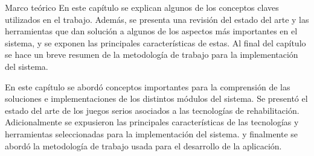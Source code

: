 \begin{thesischapter}{1} {Marco teórico}
En este capítulo se explican algunos de los conceptos claves utilizados en el trabajo. Además, se presenta una revisión del estado del arte y las herramientas que dan solución a algunos de los aspectos más importantes en el sistema, y se exponen las principales características de estas. Al final del capítulo se hace un breve resumen de la metodología de trabajo para la implementación del sistema.











En este capítulo se abordó conceptos importantes para la comprensión de las soluciones e implementaciones de los distintos módulos del sistema. Se presentó el estado del arte de los juegos serios asociados a las tecnologías de rehabilitación. Adicionalmente se expusieron las principales características de las tecnologías y herramientas seleccionadas para la implementación del sistema. y finalmente se abordó la metodología de trabajo usada para el desarrollo de la aplicación. 
\end{thesischapter}